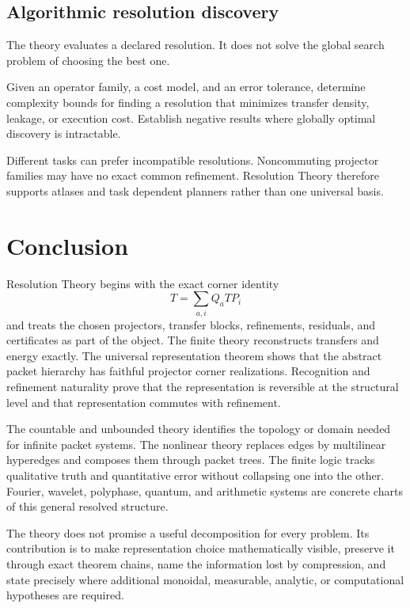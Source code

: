 \documentclass{aomart}
\theoremstyle{definition}
\theoremstyle{remark}
\begin{document}
\subsection{Algorithmic resolution discovery}

The theory evaluates a declared resolution. It does not solve the global search problem of choosing the best one.

\begin{problem}\label{prob:discovery}
Given an operator family, a cost model, and an error tolerance, determine complexity bounds for finding a resolution that minimizes transfer density, leakage, or execution cost. Establish negative results where globally optimal discovery is intractable.
\end{problem}

\begin{remark}\label{rem:no_universal_chart}
Different tasks can prefer incompatible resolutions. Noncommuting projector families may have no exact common refinement. Resolution Theory therefore supports atlases and task dependent planners rather than one universal basis.
\end{remark}

\section{Conclusion}\label{sec:conclusion}

Resolution Theory begins with the exact corner identity
\[
 T=\sum_{a,i}Q_aTP_i
\]
and treats the chosen projectors, transfer blocks, refinements, residuals, and certificates as part of the object. The finite theory reconstructs transfers and energy exactly. The universal representation theorem shows that the abstract packet hierarchy has faithful projector corner realizations. Recognition and refinement naturality prove that the representation is reversible at the structural level and that representation commutes with refinement.

The countable and unbounded theory identifies the topology or domain needed for infinite packet systems. The nonlinear theory replaces edges by multilinear hyperedges and composes them through packet trees. The finite logic tracks qualitative truth and quantitative error without collapsing one into the other. Fourier, wavelet, polyphase, quantum, and arithmetic systems are concrete charts of this general resolved structure.

The theory does not promise a useful decomposition for every problem. Its contribution is to make representation choice mathematically visible, preserve it through exact theorem chains, name the information lost by compression, and state precisely where additional monoidal, measurable, analytic, or computational hypotheses are required.



\end{document}
